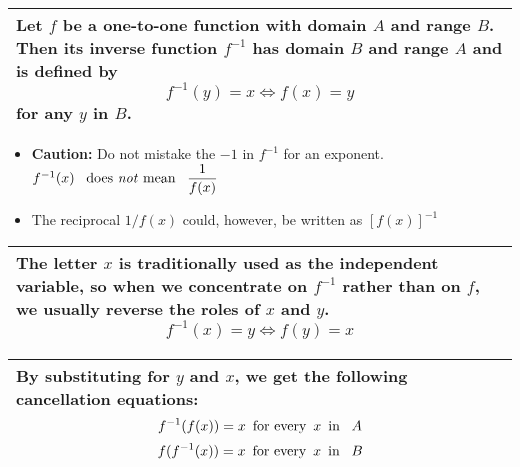 \documentclass[fleqn]{article}
\begin{document}
\begin{center}
\def\arraystretch{1.3}
{\setlength{\tabcolsep}{16pt}
\begin{tabularx}{.9\textwidth}{|X|}
\hline
	\vspace{1pt}
	Let $f$ be a one-to-one function with domain $A$ and range $B$. Then its \textbf{inverse function} $f^{-1}$ has domain $B$ and range $A$ and is defined by 
	$$f^{-1}(y) = x \Leftrightarrow f(x) = y$$
	for any $y$ in $B$.
	\\[12pt]	
\hline
\end{tabularx}}
\vspace{12pt}

\begin{itemize}
	\item \textbf{Caution:} Do not mistake the $-1$ in $f^{-1}$ for an exponent. \hspace{6pt}
	$f^{-1}(x) \text{\hspace{5pt} does \textit{not} mean \hspace{5pt}} \dfrac{1}{f(x)}$ \\
	\item The reciprocal $1/f(x)$ could, however, be written as $[f(x)]^{-1}$
\end{itemize}
\vspace{12pt}

\def\arraystretch{1.3}
{\setlength{\tabcolsep}{16pt}
\begin{tabularx}{.9\textwidth}{|X|}
\hline
	\vspace{1pt}
	The letter $x$ is traditionally used as the independent variable, so when we concentrate on $f^{-1}$ rather than on $f$, we usually reverse the roles of $x$ and $y$.
	$$f^{-1}(x) = y \Leftrightarrow f(y) = x$$
	\\
\hline
\end{tabularx}}
\vspace{12pt}

\def\arraystretch{1.3}
{\setlength{\tabcolsep}{16pt}
\begin{tabularx}{.9\textwidth}{|X|}
\hline
	\vspace{1pt}
	By substituting for $y$ and $x$, we get the following \textbf{cancellation equations}:
	$$f^{-1}(f(x)) = x \text{\hspace{5pt}for every\hspace{5pt}} x \text{\hspace{5pt}in \hspace{5pt}} A$$
	$$f(f^{-1}(x)) = x \text{\hspace{5pt}for every\hspace{5pt}} x \text{\hspace{5pt}in \hspace{5pt}} B$$
	\\
\hline
\end{tabularx}}
\vspace{12pt}


\end{center}
\end{document}
